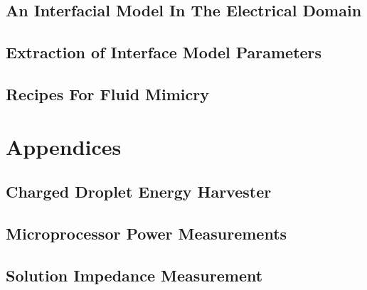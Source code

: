   \chapter{An Interfacial Model In The Electrical Domain}
    

  \chapter{Extraction of Interface Model Parameters}
    

  \chapter{Recipes For Fluid Mimicry}
  \label{chap:fluid_mimicry}
    

\part{Appendices}
  \appendix
  \chapter{Charged Droplet Energy Harvester}
    \label{appendix:chargedDropletts}
    
  \chapter{Microprocessor Power Measurements}
    
  \chapter{Solution Impedance Measurement}
    
